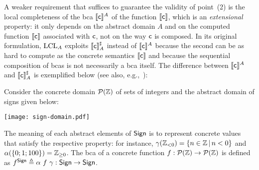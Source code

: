 A weaker requirement that suffices to guarantee the validity of point~(2) is the local completeness of the bca $\llbracket\mathsf{c}\rrbracket^{A}$ of the function $\llbracket\mathsf{c}\rrbracket$, which is an \emph{extensional} property: it only depends on the abstract domain $A$ and on the computed function $\llbracket\mathsf{c}\rrbracket$ associated with $\mathsf{c}$, not on the way $\mathsf{c}$ is composed. In its original formulation, $\text{LCL}_A$ exploits $\llbracket\mathsf{c}\rrbracket^{\sharp}_{A}$ instead of $\llbracket\mathsf{c}\rrbracket^{A}$ because the second can be as hard to compute as the concrete semantics $\llbracket\mathsf{c}\rrbracket$ and because the sequential composition of bcas is not necessarily a bca itself.
The difference between $\llbracket\mathsf{c}\rrbracket^{A}$ and $\llbracket\mathsf{c}\rrbracket^{\sharp}_{A}$ is exemplified below (see also, e.g.,~\cite[Example~1]{LL09}):

\begin{example}\label{ex:lcla:ext-vs-int}
	Consider the concrete domain $\mathcal{P}(\mathbb{Z})$ of sets of integers and the abstract domain of signs given below:
	\begin{center}
		\texttt{[image: sign-domain.pdf]}
	\end{center}
	The meaning of each abstract elements of $\mathsf{Sign}$ is to represent concrete values that satisfy the respective property: for instance, $\gamma(\mathbb{Z}_{< 0}) = \{ n \in \mathbb{Z} \,\vert\, n < 0 \}$ and $\alpha( \{ 0; 1; 100 \}) = \mathbb{Z}_{\ge 0}$.
	The bca of a concrete function $f: \mathcal{P}(\mathbb{Z}) \to \mathcal{P}(\mathbb{Z})$ is defined as $f^{\mathsf{Sign}}\triangleq \alpha~f~\gamma: \mathsf{Sign} \to \mathsf{Sign}$.


\end{example}
